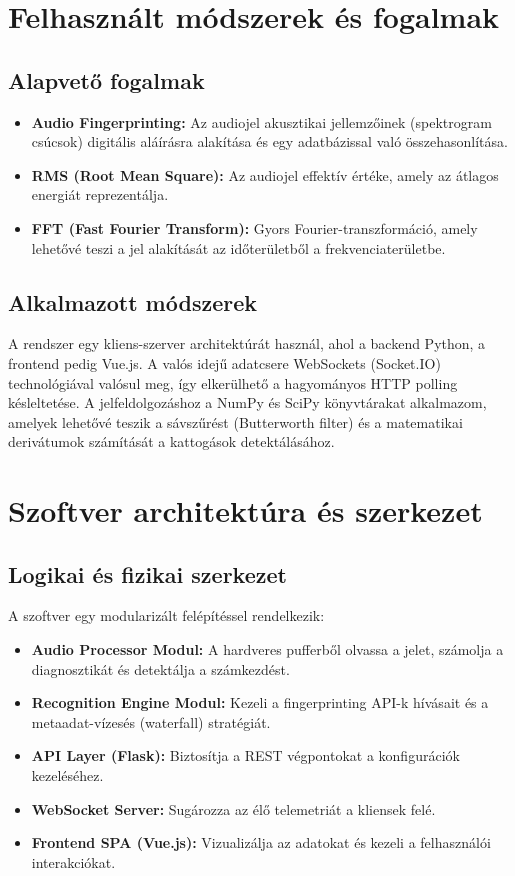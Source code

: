 \documentclass[12pt,a4paper,hungarian]{report}
\begin{document}
\section{Felhasznált módszerek és fogalmak}

\subsection{Alapvető fogalmak}
\begin{itemize}
    \item \textbf{Audio Fingerprinting:} Az audiojel akusztikai jellemzőinek (spektrogram csúcsok) digitális aláírásra alakítása és egy adatbázissal való összehasonlítása.
    \item \textbf{RMS (Root Mean Square):} Az audiojel effektív értéke, amely az átlagos energiát reprezentálja.
    \item \textbf{FFT (Fast Fourier Transform):} Gyors Fourier-transzformáció, amely lehetővé teszi a jel alakítását az időterületből a frekvenciaterületbe.
\end{itemize}

\subsection{Alkalmazott módszerek}
A rendszer egy kliens-szerver architektúrát használ, ahol a backend Python, a frontend pedig Vue.js. A valós idejű adatcsere WebSockets (Socket.IO) technológiával valósul meg, így elkerülhető a hagyományos HTTP polling késleltetése. A jelfeldolgozáshoz a NumPy és SciPy könyvtárakat alkalmazom, amelyek lehetővé teszik a sávszűrést (Butterworth filter) és a matematikai derivátumok számítását a kattogások detektálásához.

\section{Szoftver architektúra és szerkezet}

\subsection{Logikai és fizikai szerkezet}
A szoftver egy modularizált felépítéssel rendelkezik:
\begin{itemize}
    \item \textbf{Audio Processor Modul:} A hardveres pufferből olvassa a jelet, számolja a diagnosztikát és detektálja a számkezdést.
    \item \textbf{Recognition Engine Modul:} Kezeli a fingerprinting API-k hívásait és a metaadat-vízesés (waterfall) stratégiát.
    \item \textbf{API Layer (Flask):} Biztosítja a REST végpontokat a konfigurációk kezeléséhez.
    \item \textbf{WebSocket Server:} Sugározza az élő telemetriát a kliensek felé.
    \item \textbf{Frontend SPA (Vue.js):} Vizualizálja az adatokat és kezeli a felhasználói interakciókat.
\end{itemize}
\end{document}
